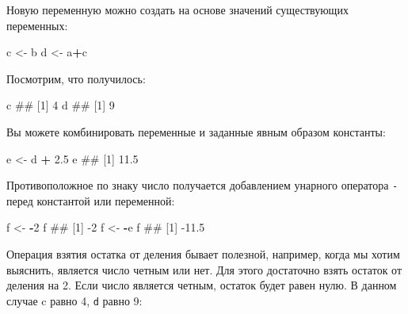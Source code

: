 \documentclass[]{book}
\newenvironment{Shaded}{\begin{snugshade}}{\end{snugshade}}
\newcommand{\DecValTok}[1]{\textcolor[rgb]{0.00,0.00,0.81}{#1}}
\newcommand{\FloatTok}[1]{\textcolor[rgb]{0.00,0.00,0.81}{#1}}
\newcommand{\StringTok}[1]{\textcolor[rgb]{0.31,0.60,0.02}{#1}}
\newcommand{\OperatorTok}[1]{\textcolor[rgb]{0.81,0.36,0.00}{\textbf{#1}}}
\newcommand{\NormalTok}[1]{#1}
\begin{document}
Новую переменную можно создать на основе значений существующих
переменных:

\begin{Shaded}
\begin{Highlighting}[]
\NormalTok{c <-}\StringTok{ }\NormalTok{b}
\NormalTok{d <-}\StringTok{ }\NormalTok{a}\OperatorTok{+}\NormalTok{c}
\end{Highlighting}
\end{Shaded}

Посмотрим, что получилось:

\begin{Shaded}
\begin{Highlighting}[]
\NormalTok{c}
\NormalTok{## [1] 4}
\NormalTok{d}
\NormalTok{## [1] 9}
\end{Highlighting}
\end{Shaded}

Вы можете комбинировать переменные и заданные явным образом константы:

\begin{Shaded}
\begin{Highlighting}[]
\NormalTok{e <-}\StringTok{ }\NormalTok{d }\OperatorTok{+}\StringTok{ }\FloatTok{2.5}
\NormalTok{e}
\NormalTok{## [1] 11.5}
\end{Highlighting}
\end{Shaded}

Противоположное по знаку число получается добавлением унарного оператора
\texttt{-} перед константой или переменной:

\begin{Shaded}
\begin{Highlighting}[]
\NormalTok{f <-}\StringTok{ }\OperatorTok{-}\DecValTok{2}
\NormalTok{f}
\NormalTok{## [1] -2}
\NormalTok{f <-}\StringTok{ }\OperatorTok{-}\NormalTok{e}
\NormalTok{f}
\NormalTok{## [1] -11.5}
\end{Highlighting}
\end{Shaded}

Операция взятия остатка от деления бывает полезной, например, когда мы
хотим выяснить, является число четным или нет. Для этого достаточно
взять остаток от деления на 2. Если число является четным, остаток будет
равен нулю. В данном случае c равно 4, \texttt{d} равно 9:

\begin{Shaded}
\end{Shaded}
\end{document}
